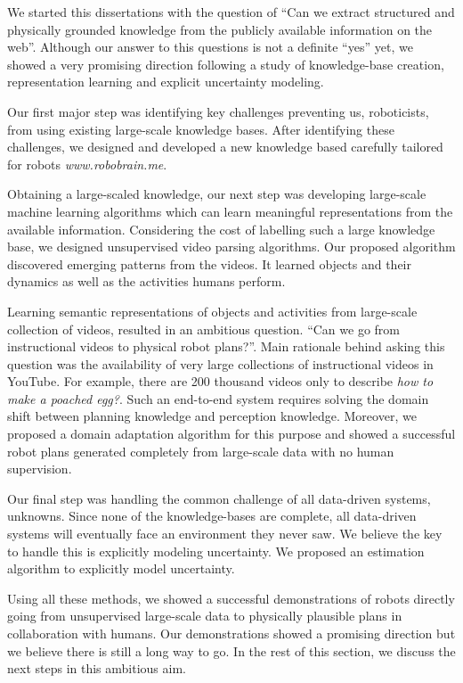 We started this dissertations with the question of ``Can we extract structured and physically grounded knowledge from the publicly available information on the web''. Although our answer to this questions is not a definite ``yes'' yet, we showed a very promising direction following a study of knowledge-base creation, representation learning and explicit uncertainty modeling. 

Our first major step was identifying key challenges preventing us, roboticists, from using  existing large-scale knowledge bases. After identifying these challenges, we designed and developed a new knowledge based carefully tailored for robots \emph{www.robobrain.me}. 

Obtaining a large-scaled knowledge, our next step was developing large-scale machine learning algorithms which can learn meaningful representations from the available information. Considering the cost of labelling such a large knowledge base, we designed unsupervised video parsing algorithms. Our proposed algorithm discovered emerging patterns from the videos. It learned objects and their dynamics as well as the activities humans perform.

Learning semantic representations of objects and activities from large-scale collection of videos, resulted in an ambitious question. ``Can we go from instructional videos to physical robot plans?''. Main rationale behind asking this question was the availability of very large collections of instructional videos in YouTube. For example, there are 200 thousand videos only to describe \emph{how to make a poached egg?}. Such an end-to-end system requires solving the domain shift between planning knowledge and perception knowledge. Moreover, we proposed a domain adaptation algorithm for this purpose and showed a successful robot plans generated completely from large-scale data with no human supervision.

Our final step was handling the common challenge of all data-driven systems, unknowns. Since none of the knowledge-bases are complete, all data-driven systems will eventually face an environment they never saw. We believe the key to handle this is explicitly modeling uncertainty. We proposed an estimation algorithm to explicitly model uncertainty. 

Using all these methods, we showed a successful demonstrations of robots directly going from unsupervised large-scale data to physically plausible plans in collaboration with humans. Our demonstrations showed a promising direction but we believe there is still a long way to go. In the rest of this section, we discuss the next steps in this ambitious aim.

